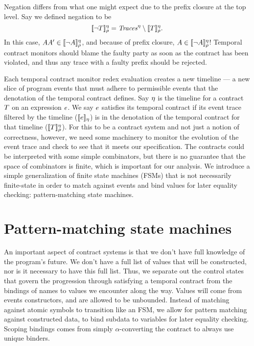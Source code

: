 \documentclass[preprint,onecolumn,9pt]{sigplanconf} %
\begin{document}
Negation differs from what one might expect due to the prefix closure at the top level.
%
Say we defined negation to be
\begin{equation*}
  [\![ \neg T ]\!]^{\eta}_{\rho} = \mathit{Traces}^\eta \setminus [\![ T ]\!]^{\eta}_{\rho}\text.
\end{equation*}
In this case, $AA' \in [\![ \neg A ]\!]^{\eta}_{\rho}$, and because of prefix closure, $A \in [\![ \neg A ]\!]^{\eta}_{\rho}$!
%
Temporal contract monitors should blame the faulty party as soon as the contract has been violated, and thus any trace with a faulty prefix should be rejected.

Each temporal contract monitor redex evaluation creates a new timeline --- a new slice of program events that must adhere to permissible events that the denotation of the temporal contract defines.
%
Say $\eta$ is the timeline for a contract $T$ on an expression $e$.
%
We say $e$ satisfies its temporal contract if its event trace filtered by the timeline ($[\![ e ]\!]_\eta$) is in the denotation of the temporal contract for that timeline ($[\![ T ]\!]^{\eta}_{\rho}$).
%
For this to be a contract system and not just a notion of correctness, however, we need some machinery to monitor the evolution of the event trace and check to see that it meets our specification.
%
The contracts could be interpreted with some simple combinators, but there is no guarantee that the space of combinators is finite, which is important for our analysis.
%
We introduce a simple generalization of finite state machines (FSMs) that is not necessarily finite-state in order to match against events and bind values for later equality checking: pattern-matching state machines.

\section{Pattern-matching state machines}

An important aspect of contract systems is that we don't have full knowledge of the program's future.
%
We don't have a full list of values that will be constructed, nor is it necessary to have this full list.
%
Thus, we separate out the control states that govern the progression through satisfying a temporal contract from the bindings of names to values we encounter along the way.
%
Values will come from events constructors, and are allowed to be unbounded.
%
Instead of matching against atomic symbols to transition like an FSM, we allow for pattern matching against constructed data, to bind subdata to variables for later equality checking.
%
Scoping bindings comes from simply $\alpha$-converting the contract to always use unique binders.
%
\end{document}
